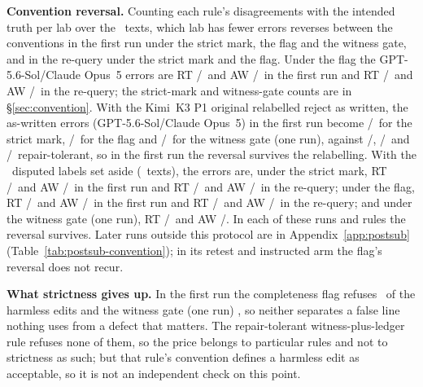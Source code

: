 \textbf{Convention reversal.} Counting each rule's disagreements with the intended truth per lab over the \CRNTexts\ texts, which lab has fewer errors reverses between the conventions in the first run under the strict mark, the flag and the witness gate, and in the re-query under the strict mark and the flag. Under the flag the GPT-5.6-Sol/Claude Opus~5 errors are RT \CRFlagErrRTGPTP/\CRFlagErrRTClaudeP\ and AW \CRFlagErrAWGPTP/\CRFlagErrAWClaudeP\ in the first run and RT \CRFlagErrRTGPTR/\CRFlagErrRTClaudeR\ and AW \CRFlagErrAWGPTR/\CRFlagErrAWClaudeR\ in the re-query; the strict-mark and witness-gate counts are in \S\ref{sec:convention}. With the Kimi~K3 P1 original relabelled reject as written, the as-written errors (GPT-5.6-Sol/Claude Opus~5) in the first run become \CRKimiRelabelStrictAWGPTP/\CRKimiRelabelStrictAWClaudeP\ for the strict mark, \CRKimiRelabelFlagAWGPTP/\CRKimiRelabelFlagAWClaudeP\ for the flag and \CRKimiRelabelWitnessAWGPTP/\CRKimiRelabelWitnessAWClaudeP\ for the witness gate (one run), against \CRStrictErrRTGPTP/\CRStrictErrRTClaudeP, \CRFlagErrRTGPTP/\CRFlagErrRTClaudeP\ and \CRWitnessErrRTGPTP/\CRWitnessErrRTClaudeP\ repair-tolerant, so in the first run the reversal survives the relabelling. With the \CRNDisputedWord\ disputed labels set aside (\CRNExclDisputedTexts\ texts), the errors are, under the strict mark, RT \CRExclErrStrictRTGPTP/\CRExclErrStrictRTClaudeP\ and AW \CRExclErrStrictAWGPTP/\CRExclErrStrictAWClaudeP\ in the first run and RT \CRExclErrStrictRTGPTR/\CRExclErrStrictRTClaudeR\ and AW \CRExclErrStrictAWGPTR/\CRExclErrStrictAWClaudeR\ in the re-query; under the flag, RT \CRExclErrFlagRTGPTP/\CRExclErrFlagRTClaudeP\ and AW \CRExclErrFlagAWGPTP/\CRExclErrFlagAWClaudeP\ in the first run and RT \CRExclErrFlagRTGPTR/\CRExclErrFlagRTClaudeR\ and AW \CRExclErrFlagAWGPTR/\CRExclErrFlagAWClaudeR\ in the re-query; and under the witness gate (one run), RT \CRExclErrWitnessRTGPTP/\CRExclErrWitnessRTClaudeP\ and AW \CRExclErrWitnessAWGPTP/\CRExclErrWitnessAWClaudeP. In each of these runs and rules the reversal survives. Later runs outside this protocol are in Appendix~\ref{app:postsub} (Table~\ref{tab:postsub-convention}); in its retest and instructed arm the flag's reversal does not recur.

\textbf{What strictness gives up.} In the first run the completeness flag refuses \PLANTHREFUSEGRADEC\ of the harmless edits and the witness gate (one run) \PLANTHREFUSEWITNESS, so neither separates a false line nothing uses from a defect that matters. The repair-tolerant witness-plus-ledger rule refuses none of them, so the price belongs to particular rules and not to strictness as such; but that rule's convention defines a harmless edit as acceptable, so it is not an independent check on this point.

